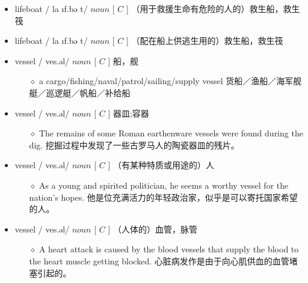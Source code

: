 \documentclass[a4paper,top=2.5cm,buttom=2.5cm10.5pt]{book}
\begin{document}
\begin{itemize}
\item lifeboat / \textprimstress la \i f.bə \textupsilon t/ $ noun $ [  $ C $  ] （用于救援生命有危险的人的）救生船，救生筏
\end{itemize}
\begin{itemize}
\item lifeboat / \textprimstress la \i f.bə \textupsilon t/ $ noun $ [  $ C $  ] （配在船上供逃生用的）救生船，救生筏
\end{itemize}
\begin{itemize}
\item vessel / \textprimstress ves.əl/ $ noun $ [  $ C $  ] 船，舰
\begin{itemize}
\item[$\diamond$] a cargo/fishing/naval/patrol/sailing/supply vessel
货船／渔船／海军舰艇／巡逻艇／帆船／补给船
\end{itemize}
\end{itemize}
\begin{itemize}
\item vessel / \textprimstress ves.əl/ $ noun $ [  $ C $  ] 器皿;容器
\begin{itemize}
\item[$\diamond$] The remains of some Roman earthenware vessels were found during the dig.
挖掘过程中发现了一些古罗马人的陶瓷器皿的残片。
\end{itemize}
\end{itemize}
\begin{itemize}
\item vessel / \textprimstress ves.əl/ $ noun $ [  $ C $  ] （有某种特质或用途的）人
\begin{itemize}
\item[$\diamond$] As a young and spirited politician, he seems a worthy vessel for the nation's hopes.
他是位充满活力的年轻政治家，似乎是可以寄托国家希望的人。
\end{itemize}
\end{itemize}
\begin{itemize}
\item vessel / \textprimstress ves.əl/ $ noun $ [  $ C $  ] （人体的）血管，脉管
\begin{itemize}
\item[$\diamond$] A heart attack is caused by the blood vessels that supply the blood to the heart muscle getting blocked.
心脏病发作是由于向心肌供血的血管堵塞引起的。
\end{itemize}
\end{itemize}
\end{document}
